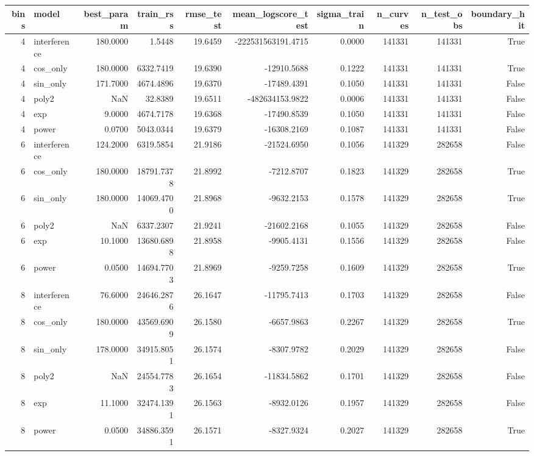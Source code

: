 \begin{tabular}{rlrrrrrrrr}
\toprule
bins & model & best_param & train_rss & rmse_test & mean_logscore_test & sigma_train & n_curves & n_test_obs & boundary_hit \\
\midrule
4 & interference & 180.0000 & 1.5448 & 19.6459 & -222531563191.4715 & 0.0000 & 141331 & 141331 & True \\
4 & cos_only & 180.0000 & 6332.7419 & 19.6390 & -12910.5688 & 0.1222 & 141331 & 141331 & True \\
4 & sin_only & 171.7000 & 4674.4896 & 19.6370 & -17489.4391 & 0.1050 & 141331 & 141331 & False \\
4 & poly2 & NaN & 32.8389 & 19.6511 & -482634153.9822 & 0.0006 & 141331 & 141331 & False \\
4 & exp & 9.0000 & 4674.7178 & 19.6368 & -17490.8539 & 0.1050 & 141331 & 141331 & False \\
4 & power & 0.0700 & 5043.0344 & 19.6379 & -16308.2169 & 0.1087 & 141331 & 141331 & False \\
6 & interference & 124.2000 & 6319.5854 & 21.9186 & -21524.6950 & 0.1056 & 141329 & 282658 & False \\
6 & cos_only & 180.0000 & 18791.7378 & 21.8992 & -7212.8707 & 0.1823 & 141329 & 282658 & True \\
6 & sin_only & 180.0000 & 14069.4700 & 21.8968 & -9632.2153 & 0.1578 & 141329 & 282658 & True \\
6 & poly2 & NaN & 6337.2307 & 21.9241 & -21602.2168 & 0.1055 & 141329 & 282658 & False \\
6 & exp & 10.1000 & 13680.6898 & 21.8958 & -9905.4131 & 0.1556 & 141329 & 282658 & False \\
6 & power & 0.0500 & 14694.7703 & 21.8969 & -9259.7258 & 0.1609 & 141329 & 282658 & True \\
8 & interference & 76.6000 & 24646.2876 & 26.1647 & -11795.7413 & 0.1703 & 141329 & 282658 & False \\
8 & cos_only & 180.0000 & 43569.6909 & 26.1580 & -6657.9863 & 0.2267 & 141329 & 282658 & True \\
8 & sin_only & 178.0000 & 34915.8051 & 26.1574 & -8307.9782 & 0.2029 & 141329 & 282658 & False \\
8 & poly2 & NaN & 24554.7783 & 26.1654 & -11834.5862 & 0.1701 & 141329 & 282658 & False \\
8 & exp & 11.1000 & 32474.1391 & 26.1563 & -8932.0126 & 0.1957 & 141329 & 282658 & False \\
8 & power & 0.0500 & 34886.3591 & 26.1571 & -8327.9324 & 0.2027 & 141329 & 282658 & True \\
\bottomrule
\end{tabular}
